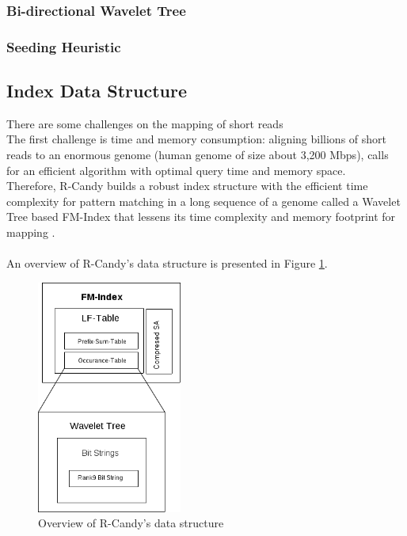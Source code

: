 \documentclass[11pt,a4paper]{report}
\begin{document}


\subsubsection{Bi-directional Wavelet Tree}





\subsubsection{Seeding Heuristic}



\subsection{Index Data Structure} \label{Index Data Structure}

There are some challenges on the mapping of short reads\\
The first challenge is time and memory consumption: aligning billions of short
reads to an enormous genome (human genome of size about 3,200 Mbps), 
calls for an efficient algorithm with optimal query time and memory space.\\
Therefore, R-Candy builds a robust index structure with 
the efficient time complexity for pattern matching in a long sequence of a genome
called a Wavelet Tree based FM-Index that lessens its time complexity and memory footprint for mapping . 
\\\\
An overview of R-Candy's data structure is presented in Figure \ref{DSOverview}\cite{Wavthesis}.\\

\begin{figure}[H]
\centering
\includegraphics[width=4.75cm]{pictures/DSOverview2.png}
\caption{Overview of R-Candy's data structure }
\label{DSOverview}
\end{figure}
\end{document}
